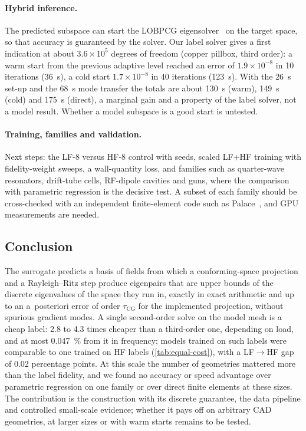 \paragraph{Hybrid inference.}
The predicted subspace can start the LOBPCG eigensolver~\cite{knyazev2001toward} on the target space, so that accuracy is guaranteed by the solver.
Our label solver gives a first indication at about $3.6\times10^5$ degrees of freedom (copper pillbox, third order): a warm start from the previous adaptive level reached an error of $1.9\times10^{-8}$ in 10 iterations (\SI{36}{s}), a cold start $1.7\times10^{-8}$ in 40 iterations (\SI{123}{s}). %
With the \SI{26}{s} set-up and the \SI{68}{s} mode transfer the totals are about \SI{130}{s} (warm), \SI{149}{s} (cold) and \SI{175}{s} (direct), a marginal gain and a property of the label solver, not a model result. %
Whether a model subspace is a good start is untested.

\paragraph{Training, families and validation.}
Next steps: the LF-8 versus HF-8 control with seeds, scaled LF+HF training with fidelity-weight sweeps, a wall-quantity loss, and families such as quarter-wave resonators, drift-tube cells, RF-dipole cavities and guns, where the comparison with parametric regression is the decisive test. %
A subset of each family should be cross-checked with an independent finite-element code such as Palace~\cite{awslabs2023palace}, and GPU measurements are needed.

\subsection{Conclusion}\label{sec:08-conclusion}

The surrogate predicts a basis of fields from which a conforming-space projection and a Rayleigh--Ritz step produce eigenpairs that are upper bounds of the discrete eigenvalues of the space they run in, exactly in exact arithmetic and up to an a~posteriori error of order $\tau_{\mathrm{CG}}$ for the implemented projection, without spurious gradient modes.
A single second-order solve on the model mesh is a cheap label: 2.8 to 4.3 times cheaper than a third-order one, depending on load, and at most \SI{0.047}{\percent} from it in frequency; %
models trained on such labels were comparable to one trained on HF labels (\cref{tab:equal-cost}), with a LF$\to$HF gap of 0.02 percentage points. %
At this scale the number of geometries mattered more than the label fidelity, and we found no accuracy or speed advantage over parametric regression on one family or over direct finite elements at these sizes.
The contribution is the construction with its discrete guarantee, the data pipeline and controlled small-scale evidence; whether it pays off on arbitrary CAD geometries, at larger sizes or with warm starts remains to be tested.
